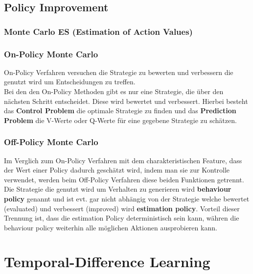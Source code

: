 \documentclass[10pt]{scrartcl}
\begin{document}
\subsection{Policy Improvement}
\subsubsection{Monte Carlo ES (Estimation of Action Values)}


\subsubsection{On-Policy Monte Carlo}
On-Policy Verfahren versuchen die Strategie zu bewerten und verbessern die genutzt wird um Entscheidungen zu treffen.\\
Bei den den On-Policy Methoden gibt es nur eine Strategie, die über den nächsten Schritt entscheidet. Diese wird bewertet und verbessert. Hierbei besteht das \textbf{Control Problem} die optimale Strategie zu finden und das \textbf{Prediction Problem} die V-Werte oder Q-Werte für eine gegebene Strategie zu schätzen. 

\subsubsection{Off-Policy Monte Carlo}
Im Verglich zum On-Policy Verfahren mit dem charakteristischen Feature, dass der Wert einer Policy dadurch geschätzt wird, indem man sie zur Kontrolle verwendet, werden beim Off-Policy Verfahren diese beiden Funktionen getrennt.\\
Die Strategie die genutzt wird um Verhalten zu generieren wird \textbf{behaviour policy} genannt und ist evt. gar nicht abhängig von der Strategie welche bewertet (evaluated) und verbessert (improved) wird  \textbf{estimation policy}. Vorteil dieser Trennung ist, dass die estimation Policy deterministisch sein kann, währen die behaviour policy weiterhin alle möglichen Aktionen ausprobieren kann.

\section{Temporal-Difference Learning}
\end{document}
